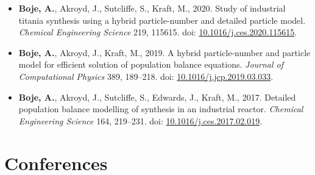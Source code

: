 \documentclass[11pt,a4paper,sans]{moderncv}   %
\def\addls{\vspace{2pt}}
\begin{document}
\begin{itemize}
		\addls
		
		\item{\textbf{Boje, A.}, {Akroyd}, J., {Sutcliffe}, S., {Kraft}, M., 2020. Study of industrial titania synthesis using a hybrid particle-number and detailed particle model. \textit{Chemical Engineering Science} 219, 115615. doi:  \textcolor{royalblue}{\href{https://doi.org/10.1016/j.ces.2020.115615}{10.1016/j.ces.2020.115615}}.}
		
		\addls
		
		\item{\textbf{{Boje}, A.}, {Akroyd}, J., {Kraft}, M., 2019. A hybrid particle-number and particle model for efficient solution of population balance equations. \textit{Journal of Computational Physics} 389, 189--218. doi: \textcolor{royalblue}{\href{https://doi.org/10.1016/j.jcp.2019.03.033}{10.1016/j.jcp.2019.03.033}}.}
		
		\addls
		
		\item{\textbf{Boje, A.}, {Akroyd}, J., {Sutcliffe}, S., {Edwards}, J., {Kraft}, M., 2017. Detailed population balance modelling of  synthesis in an industrial reactor.  \textit{Chemical Engineering Science} 164, 219--231. doi: \textcolor{royalblue}{\href{https://doi.org/10.1016/j.ces.2017.02.019}{10.1016/j.ces.2017.02.019}}.}
		
	\end{itemize}
	
	\addls
	
	\section{Conferences}
	
	\addls
	
\end{document}
